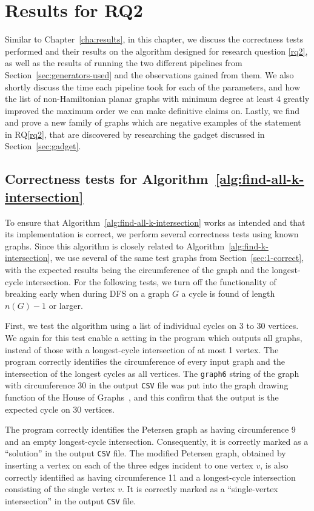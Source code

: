 \chapter{Results for RQ2}
\label{cha:results-2}

Similar to Chapter~\ref{cha:results}, in this chapter, we discuss the correctness tests performed and their results on the algorithm designed for research question \ref{rq2}, as well as the results of running the two different pipelines from Section~\ref{sec:generators-used} and the observations gained from them. We also shortly discuss the time each pipeline took for each of the parameters, and how the list of non-Hamiltonian planar graphs with minimum degree at least 4 greatly improved the maximum order we can make definitive claims on. Lastly, we find and prove a new family of graphs which are negative examples of the statement in RQ\ref{rq2}, that are discovered by researching the gadget discussed in Section~\ref{sec:gadget}.

\section{Correctness tests for Algorithm~\ref{alg:find-all-k-intersection}}

To ensure that Algorithm~\ref{alg:find-all-k-intersection} works as intended and that its implementation is correct, we perform several correctness tests using known graphs. Since this algorithm is closely related to Algorithm~\ref{alg:find-k-intersection}, we use several of the same test graphs from Section~\ref{sec:1-correct}, with the expected results being the circumference of the graph and the longest-cycle intersection. For the following tests, we turn off the functionality of breaking early when during DFS on a graph $G$ a cycle is found of length $n(G)-1$ or larger.

First, we test the algorithm using a list of individual cycles on 3 to 30 vertices. We again for this test enable a setting in the program which outputs all graphs, instead of those with a longest-cycle intersection of at most 1 vertex. The program correctly identifies the circumference of every input graph and the intersection of the longest cycles as all vertices. The \texttt{graph6} string of the graph with circumference 30 in the output \texttt{CSV} file was put into the graph drawing function of the House of Graphs~\cite{data:houseofgraphs}, and this confirm that the output is the expected cycle on 30 vertices.

The program correctly identifies the Petersen graph as having circumference 9 and an empty longest-cycle intersection. Consequently, it is correctly marked as a ``solution'' in the output \texttt{CSV} file. The modified Petersen graph, obtained by inserting a vertex on each of the three edges incident to one vertex $v$, is also correctly identified as having circumference 11 and a longest-cycle intersection consisting of the single vertex $v$. It is correctly marked as a ``single-vertex intersection'' in the output \texttt{CSV} file.

